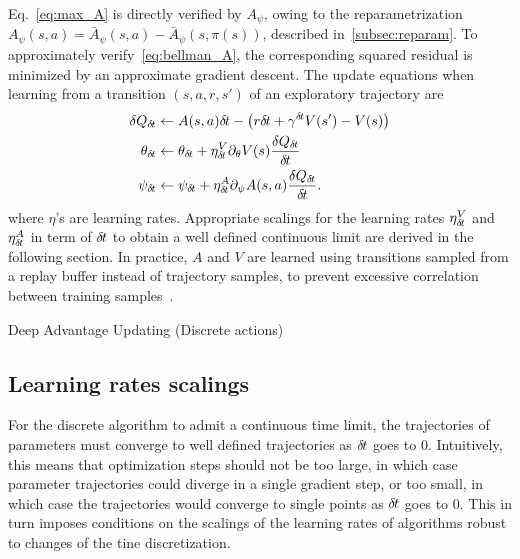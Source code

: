 Eq.~\eqref{eq:max_A}
is directly verified by $A_{\psi}$, owing to the reparametrization
$A_\psi(s, a) = \bar{A}_\psi(s, a) - \bar{A}_\psi(s, \pi(s))$, described
in~\ref{subsec:reparam}.  To approximately verify~\eqref{eq:bellman_A}, the
corresponding squared residual is minimized by an approximate gradient descent.
The update equations when learning from a transition $(s, a, r, s')$ of
an exploratory trajectory are
\begin{align}
	\delta Q_{\delta\hspace{-.1em}t} &\leftarrow A(s, a) {\delta\hspace{-.1em}t} - \left(r {\delta\hspace{-.1em}t} + \gamma^{{\delta\hspace{-.1em}t}} V(s') - V(s)\right)\\
	\theta_{\delta\hspace{-.1em}t} &\leftarrow \theta_{\delta\hspace{-.1em}t} + \eta^V_{\delta\hspace{-.1em}t} \partial_{\theta} V(s) \frac{\delta Q_{\delta\hspace{-.1em}t}}{{\delta\hspace{-.1em}t}}\\
	\psi_{\delta\hspace{-.1em}t} &\leftarrow \psi_{\delta\hspace{-.1em}t} + \eta^A_{\delta\hspace{-.1em}t} \partial_{\psi} A(s, a) \frac{\delta Q_{\delta\hspace{-.1em}t}}{{\delta\hspace{-.1em}t}}.
	\label{eq:approx_bellman_A}
\end{align} 
where $\eta$'s are learning rates.
Appropriate scalings for the learning rates $\eta^V_{\delta\hspace{-.1em}t}$ and $\eta^A_{\delta\hspace{-.1em}t}$ in term of ${\delta\hspace{-.1em}t}$ to obtain a well defined continuous limit are derived in the following section. 
In practice, $A$ and $V$ are learned using
transitions sampled from a replay buffer instead of trajectory samples, to
prevent excessive correlation between training samples~\cite{dqn}.
\begin{algorithm}[ht]
	\caption{Deep Advantage Updating (Discrete actions)}
	
	\label{alg:dau}
\end{algorithm}

\subsection{Learning rates scalings}
\label{subsec:lr}
For the discrete algorithm to admit a continuous time limit, the trajectories
of parameters must converge to well defined trajectories as ${\delta\hspace{-.1em}t}$ goes to
$0$.  Intuitively, this means that optimization steps should not be too large,
in which case parameter trajectories could diverge in a single gradient step,
or too small, in which case the trajectories would converge to single points as
${\delta\hspace{-.1em}t}$ goes to $0$.  This in turn imposes conditions on the scalings of the
learning rates of algorithms robust to changes of the tine discretization.

